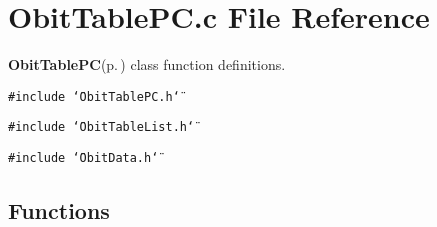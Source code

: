 \section{Obit\-Table\-PC.c File Reference}
\label{ObitTablePC_8c}
{\bf Obit\-Table\-PC}{\rm (p.\,\pageref{structObitTablePC})} class function definitions. 

{\tt \#include \char`\"{}Obit\-Table\-PC.h\char`\"{}}\par
{\tt \#include \char`\"{}Obit\-Table\-List.h\char`\"{}}\par
{\tt \#include \char`\"{}Obit\-Data.h\char`\"{}}\par
\subsection*{Functions}
